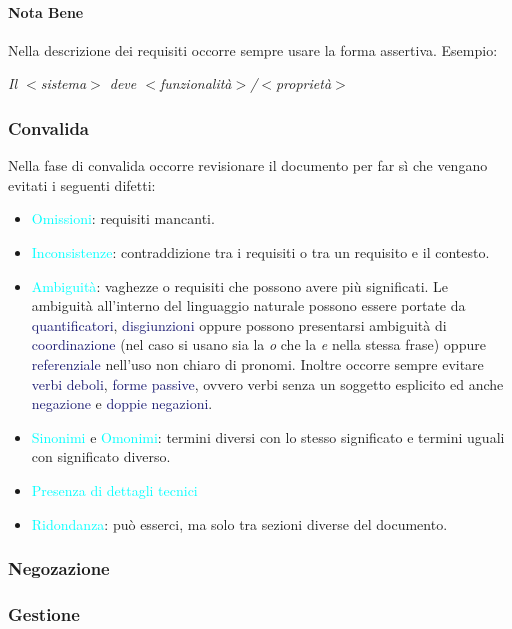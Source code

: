 \paragraph{Nota Bene} Nella descrizione dei requisiti occorre sempre usare la forma assertiva.
Esempio:
\begin{center}
    \emph{Il $<$sistema$>$ deve $<$funzionalità$>$/$<$proprietà$>$}
\end{center}

\subsubsection{Convalida}

Nella fase di convalida occorre revisionare il documento per far sì che vengano
evitati i seguenti difetti:

\begin{itemize}
    \item \textcolor{cyan}{Omissioni}: requisiti mancanti.
    \item \textcolor{cyan}{Inconsistenze}: contraddizione tra i requisiti o tra un requisito e il contesto.
    \item \textcolor{cyan}{Ambiguità}: vaghezze o requisiti che possono avere più significati. Le ambiguità all'interno del linguaggio naturale
        possono essere portate da \textcolor{MidnightBlue}{quantificatori}, \textcolor{MidnightBlue}{disgiunzioni}
        oppure possono presentarsi ambiguità di \textcolor{MidnightBlue}{coordinazione} (nel caso si usano sia la \emph{o} che la \emph{e} nella stessa frase) oppure 
        \textcolor{MidnightBlue}{referenziale} nell'uso non chiaro di pronomi.
        Inoltre occorre sempre evitare \textcolor{MidnightBlue}{verbi deboli}, \textcolor{MidnightBlue}{forme passive}, ovvero verbi senza un soggetto esplicito ed anche \textcolor{MidnightBlue}{negazione}
        e \textcolor{MidnightBlue}{doppie negazioni}.
    \item \textcolor{cyan}{Sinonimi} e \textcolor{cyan}{Omonimi}: termini diversi con lo stesso significato e termini uguali con significato diverso.
    \item \textcolor{cyan}{Presenza di dettagli tecnici}
    \item \textcolor{cyan}{Ridondanza}: può esserci, ma solo tra sezioni diverse del documento.
\end{itemize}

\subsubsection{Negozazione}

\subsubsection{Gestione}